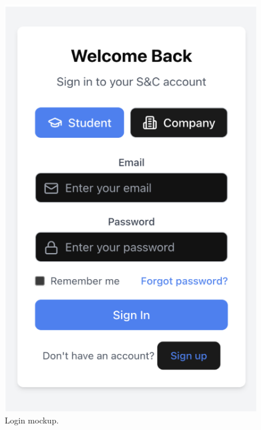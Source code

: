 \begin{figure}[H]
    \centering
    \begin{minipage}{0.33\textwidth}
        \centering
        \includegraphics[width=\linewidth]{JhaBhatiaSharma/Images/Mockups/Login.png}
        \caption{Login mockup.}
        \label{fig:login_mockup}
    \end{minipage}
    \hspace{1cm} %
    \begin{minipage}{0.33\textwidth}
        \centering

\end{minipage}
\end{figure}

